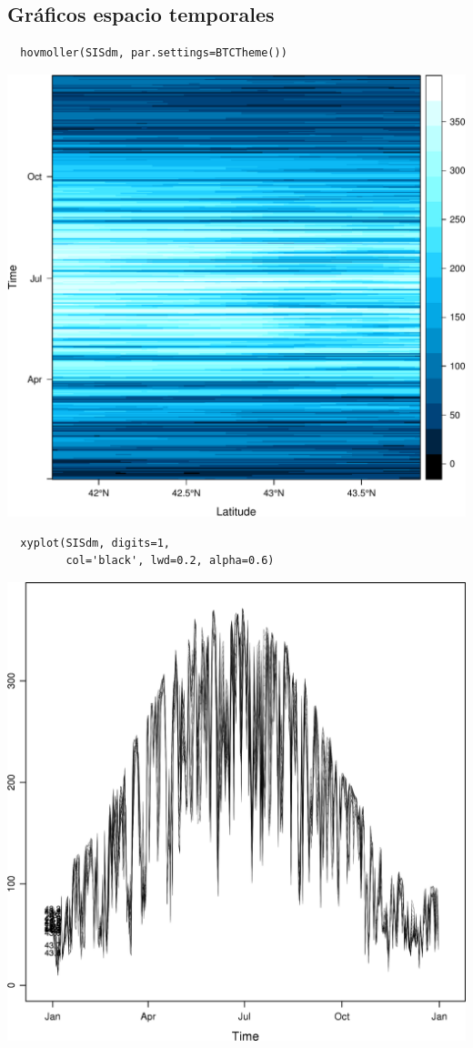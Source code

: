 \documentclass[xcolor={usenames,svgnames,dvipsnames}]{beamer}
\begin{document}
\subsection{Gráficos espacio temporales}
\label{sec-4-4}

\begin{frame}[fragile,label=sec-4-4-1]{}
 \lstset{language=R,label= ,caption= ,numbers=none}
\begin{lstlisting}
  hovmoller(SISdm, par.settings=BTCTheme())
\end{lstlisting}
\includegraphics[width=.9\linewidth]{figs/SISdm_hovmoller_lat.pdf}
\end{frame}

\begin{frame}[fragile,label=sec-4-4-2]{}
 \lstset{language=R,label= ,caption= ,numbers=none}
\begin{lstlisting}
  xyplot(SISdm, digits=1,
         col='black', lwd=0.2, alpha=0.6)
\end{lstlisting}

\includegraphics[width=.9\linewidth]{figs/SISmm_xyplot.png}
\end{frame}
\end{document}

